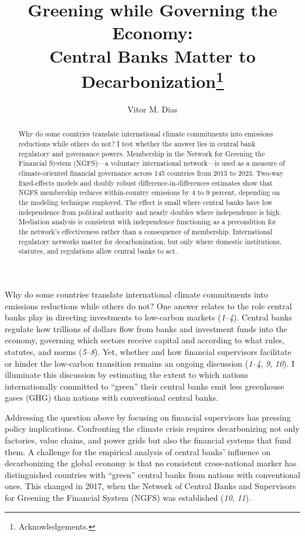 \documentclass[
  12pt,
  letterpaper,
]{article}
\title{Greening while Governing the Economy:\\
Central Banks Matter to Decarbonization\thanks{Acknowledgements.}}
\author{Vitor M. Dias}
\date{}
\begin{document}
\maketitle
\begin{abstract}
Why do some countries translate international climate commitments into
emissions reductions while others do not? I test whether the answer lies
in central bank regulatory and governance powers. Membership in the
Network for Greening the Financial System (NGFS)---a voluntary
international network---is used as a measure of climate-oriented
financial governance across 145 countries from 2013 to 2023. Two-way
fixed-effects models and doubly robust difference-in-differences
estimates show that NGFS membership reduces within-country emissions by
4 to 9 percent, depending on the modeling technique employed. The effect
is small where central banks have low independence from political
authority and nearly doubles where independence is high. Mediation
analysis is consistent with independence functioning as a precondition
for the network's effectiveness rather than a consequence of membership.
International regulatory networks matter for decarbonization, but only
where domestic institutions, statutes, and regulations allow central
banks to act.
\end{abstract}


\newpage{}

Why do some countries translate international climate commitments into
emissions reductions while others do not? One answer relates to the role
central banks play in directing investments to low-carbon markets
(\emph{1}--\emph{4}). Central banks regulate how trillions of dollars
flow from banks and investment funds into the economy, governing which
sectors receive capital and according to what rules, statutes, and norms
(\emph{5}--\emph{8}). Yet, whether and how financial supervisors
facilitate or hinder the low-carbon transition remains an ongoing
discussion (\emph{1}--\emph{4}, \emph{9}, \emph{10}). I illuminate this
discussion by estimating the extent to which nations internationally
committed to ``green'' their central banks emit less greenhouse gases
(GHG) than nations with conventional central banks.

Addressing the question above by focusing on financial supervisors has
pressing policy implications. Confronting the climate crisis requires
decarbonizing not only factories, value chains, and power grids but also
the financial systems that fund them. A challenge for the empirical
analysis of central banks' influence on decarbonizing the global economy
is that no consistent cross-national marker has distinguished countries
with ``green'' central banks from nations with conventional ones. This
changed in 2017, when the Network of Central Banks and Supervisors for
Greening the Financial System (NGFS) was established (\emph{10},
\emph{11}).
\end{document}
